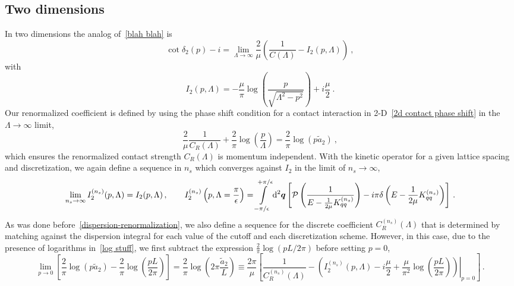 \subsection{Two dimensions}

In two dimensions the analog of~\eqref{blah blah} is
\begin{equation}
\cot \delta_2(p) - i =\lim_{\Lambda\to\infty}\frac{2}{\mu}\left(\frac{1}{C(\Lambda)}- I_2(p, \Lambda)\right)\ , %
\end{equation}
with
\begin{equation}
I_2(p, \Lambda)
=
-\frac{\mu}{\pi } \log \left(\frac{p}{\sqrt{\Lambda ^2-p^2}}\right)
+ i\frac{\mu }{2}
\ .
\end{equation}
Our renormalized coefficient is defined by using the phase shift condition for a contact interaction in 2-D~\eqref{2d contact phase shift} in the $\Lambda\to\infty$ limit,
\begin{equation}\label{eq:log stuff}
	\frac{2}{\mu}\frac{1}{C_R(\Lambda)} + \frac{2}{\pi } \log \left(\frac{p}{\Lambda}\right)
	=
	\frac { 2 } { \pi } \log \left( p \tilde a _ { 2 } \right)\ ,
\end{equation}
which ensures the renormalized contact strength $C_R(\Lambda)$ is momentum independent.
With the kinetic operator for a given lattice spacing and discretization, we again define a sequence in $n_s$ which converges against $I_2$ in the limit of $n_s \to \infty$,
\begin{equation}
	\lim\limits_{n_s \to \infty} I^{(n_s)}_2(p, \Lambda) = I_2(p, \Lambda)
	\, , \qquad
	I^{(n_s)}_2\left(p, \Lambda=\frac{\pi}{\epsilon} \right)
	=
	    \int\limits_{-\pi/\epsilon}^{+\pi/\epsilon}
        \mathrm{d}^2 \boldsymbol{q}
        \left[
            \mathcal{P} \left(
                \frac{1}{
                    E - \frac{1}{2\mu} K_{qq}^{(n_s)} }
                \right)
            -i \pi \delta\left(E - \frac{1}{2\mu}K_{qq}^{(n_s)}\right)
        \right]
        \, .
\end{equation}
As was done before~\eqref{dispersion-renormalization}, we also define a sequence for the discrete coefficient $C^{(n_s)}_R(\Lambda)$ that is determined by matching against the dispersion integral for each value of the cutoff and each discretization scheme.  However, in this case, due to the presence of logarithms in~\eqref{log stuff}, we first subtract the expression $\frac{2}{\pi}\log(pL/2\pi)$ before setting $p=0$,
\begin{equation}
	\lim\limits_{p\to 0}
	\left[
		\frac { 2 } { \pi } \log \left( p \tilde a _ { 2 } \right)-\frac{2}{\pi } \log \left(\frac{pL}{2\pi}\right)
	\right]
	=
	\frac { 2 } { \pi } \log \left(2\pi \frac{\tilde a _ { 2 }}{L} \right)
	\equiv
	\frac{2 \pi}{\mu}
		\left[
		\frac{1}{C_R^{(n_s)}(\Lambda)} - \left.\left(I_2^{(n_s)}(p, \Lambda) - i\frac{\mu}{2}+\frac{\mu}{\pi^2} \log \left(\frac{pL}{2\pi}\right)\right)\right|_{p=0}
		\right]
	\, .
\end{equation}
